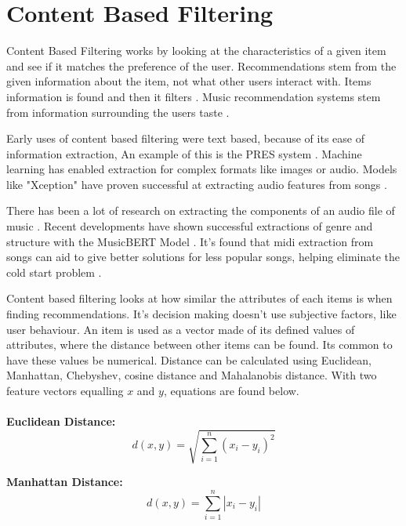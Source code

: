 \section{Content Based Filtering}

Content Based Filtering works by looking at the characteristics of a given item and see if it matches the preference of the user. Recommendations stem from the given information about the item, not what other users interact with. Items information is found and then it filters \citep{casey_content-based_2008}. Music recommendation systems stem from information surrounding the users taste\citep{aucouturier_music_2002} \citep{logan_music_2004}. 

Early uses of content based filtering were text based, because of its ease of information extraction, An example of this is the PRES system \citep{van_meteren_using_2000}. Machine learning has enabled extraction for complex formats like images or audio. Models like "Xception" have proven successful at extracting audio features from songs \citep{chollet_xception_2017} \citep{singh_robustness_2022}.

There has been a lot of research on extracting the components of an audio file of music \citep{ribecky_multi-input_2021} \citep{zhao_musical_2022}. Recent developments have shown successful extractions of genre and structure with the MusicBERT Model \citep{zhu_musicbert_2021}. It's found that midi extraction from songs can aid to give better solutions for less popular songs, helping eliminate the cold start problem \citep{yadav_improved_2022}.

Content based filtering looks at how similar the attributes of each items is when finding recommendations. It's decision making doesn't use subjective factors, like user behaviour. An item is used as a vector made of its defined values of attributes, where the distance between other items can be found. Its common to have these values be numerical. Distance can be calculated using Euclidean, Manhattan, Chebyshev, cosine distance and Mahalanobis distance. With two feature vectors equalling $x$ and $y$, equations are found below.
\\
\\
\textbf{Euclidean Distance:}
\begin{equation}
	d(x,y) = \sqrt{\sum _{i=1} ^{n}(x_{i} - y_{i})^{2}}
\end{equation}

\textbf{Manhattan Distance:}
\begin{equation}
	d(x,y) = \sum _{i=1} ^{n} | x_{i} - y_{i} |
\end{equation}

